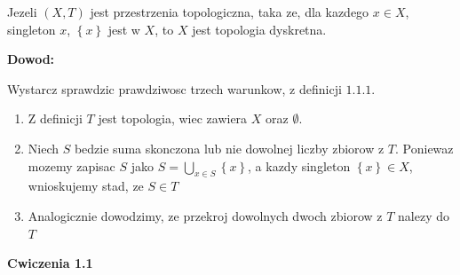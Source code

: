 \documentclass{article}
\begin{document}
\begin{tcolorbox}[colback=white!90!green,colframe=black!35!green,title=1.1.9 Lemat: Topologia dyskretna i singletony]

    Jezeli $(X,T)$ jest przestrzenia topologiczna, taka ze, dla kazdego $x \in X$, singleton $x$, $\left\{x\right\}$ jest w $X$, to $X$ jest topologia dyskretna.

\end{tcolorbox}
\textbf{Dowod:}

Wystarcz sprawdzic prawdziwosc trzech warunkow, z definicji $1.1.1$.
\begin{enumerate}
    \item Z definicji $T$ jest topologia, wiec zawiera $X$ oraz $\emptyset$.
    \item Niech $S$ bedzie suma skonczona lub nie dowolnej liczby zbiorow z $T$. Poniewaz mozemy zapisac $S$ jako $S = \bigcup\limits_{x \in S}\left\{x\right\}$, a kazdy singleton $\left\{x\right\} \in X$, wnioskujemy stad, ze $S \in T$ 
    \item Analogicznie dowodzimy, ze przekroj dowolnych dwoch zbiorow z $T$ nalezy do $T$
\end{enumerate}

\hrulefill

\textbf{Cwiczenia 1.1}
\end{document}
